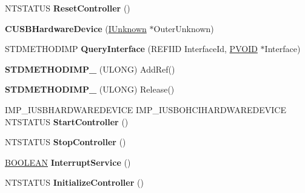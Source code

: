 \begin{DoxyCompactItemize}
N\+T\+S\+T\+A\+T\+US {\bfseries Reset\+Controller} ()
\item 
\mbox{\label{class_c_u_s_b_hardware_device_aa2b87081242b129aa1b4cfab189e0265}} 
{\bfseries C\+U\+S\+B\+Hardware\+Device} (\hyperlink{interface_i_unknown}{I\+Unknown} $\ast$Outer\+Unknown)
\item 
\mbox{\label{class_c_u_s_b_hardware_device_add03c1ce4739d30eb3120b009009b1ad}} 
S\+T\+D\+M\+E\+T\+H\+O\+D\+I\+MP {\bfseries Query\+Interface} (R\+E\+F\+I\+ID Interface\+Id, \hyperlink{interfacevoid}{P\+V\+O\+ID} $\ast$Interface)
\item 
\mbox{\label{class_c_u_s_b_hardware_device_a64dbb65e59d97d17de77e02c4d692bdb}} 
{\bfseries S\+T\+D\+M\+E\+T\+H\+O\+D\+I\+M\+P\+\_\+} (U\+L\+O\+NG) Add\+Ref()
\item 
\mbox{\label{class_c_u_s_b_hardware_device_afe685aebe72aac9ebe1e83a0af2dbd56}} 
{\bfseries S\+T\+D\+M\+E\+T\+H\+O\+D\+I\+M\+P\+\_\+} (U\+L\+O\+NG) Release()
\item 
\mbox{\label{class_c_u_s_b_hardware_device_a4c04d3474c589094842587db235e60e5}} 
I\+M\+P\+\_\+\+I\+U\+S\+B\+H\+A\+R\+D\+W\+A\+R\+E\+D\+E\+V\+I\+CE I\+M\+P\+\_\+\+I\+U\+S\+B\+O\+H\+C\+I\+H\+A\+R\+D\+W\+A\+R\+E\+D\+E\+V\+I\+CE N\+T\+S\+T\+A\+T\+US {\bfseries Start\+Controller} ()
\item 
\mbox{\label{class_c_u_s_b_hardware_device_a457e6a85dd887c65fda56bac77ea8d56}} 
N\+T\+S\+T\+A\+T\+US {\bfseries Stop\+Controller} ()
\item 
\mbox{\label{class_c_u_s_b_hardware_device_a0b227440b992c7d9d47df621cc2da7a4}} 
\hyperlink{_processor_bind_8h_a112e3146cb38b6ee95e64d85842e380a}{B\+O\+O\+L\+E\+AN} {\bfseries Interrupt\+Service} ()
\item 
\mbox{\label{class_c_u_s_b_hardware_device_a6fa633eacb3d5281f2a5bafc2c24d887}} 
N\+T\+S\+T\+A\+T\+US {\bfseries Initialize\+Controller} ()
\item 
\mbox{\label{class_c_u_s_b_hardware_device_ac796c0a7d52d28ef9d249df19c892dcb}} 

\end{DoxyCompactItemize}
